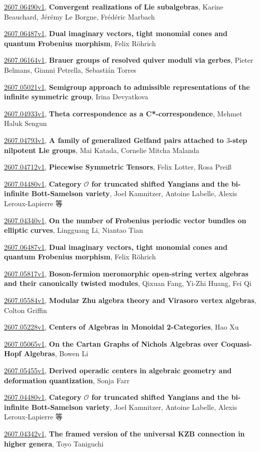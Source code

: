 \documentclass[9pt, a4paper]{article}
\theoremstyle{plain}
\theoremstyle{definition}
\theoremstyle{remark}
\newcommand{\arxiv}[3]{\href{https://arxiv.org/abs/#1}{#1}, \textbf{\textcolor{arxivblue}{#2}}, #3}
\begin{document}
\arxiv{2607.06490v1}{Convergent realizations of Lie subalgebras}{Karine Beauchard, Jérémy Le Borgne, Frédéric Marbach}

\arxiv{2607.06487v1}{Dual imaginary vectors, tight monomial cones and quantum Frobenius morphism}{Felix Röhrich}

\arxiv{2607.06164v1}{Brauer groups of resolved quiver moduli via gerbes}{Pieter Belmans, Gianni Petrella, Sebastián Torres}

\arxiv{2607.05021v1}{Semigroup approach to admissible representations of the infinite symmetric group}{Irina Devyatkova}

\arxiv{2607.04933v1}{Theta correspondence as a C*-correspondence}{Mehmet Haluk Sengun}

\arxiv{2607.04793v1}{A family of generalized Gelfand pairs attached to $3$-step nilpotent Lie groups}{Mai Katada, Cornelie Mitcha Malanda}

\arxiv{2607.04712v1}{Piecewise Symmetric Tensors}{Felix Lotter, Rosa Preiß}

\arxiv{2607.04480v1}{Category $\mathcal{O}$ for truncated shifted Yangians and the bi-infinite Bott-Samelson variety}{Joel Kamnitzer, Antoine Labelle, Alexis Leroux-Lapierre 等}

\arxiv{2607.04340v1}{On the number of Frobenius periodic vector bundles on elliptic curves}{Lingguang Li, Niantao Tian}

\arxiv{2607.06487v1}{Dual imaginary vectors, tight monomial cones and quantum Frobenius morphism}{Felix Röhrich}

\arxiv{2607.05817v1}{Boson-fermion meromorphic open-string vertex algebras and their canonically twisted modules}{Qixuan Fang, Yi-Zhi Huang, Fei Qi}

\arxiv{2607.05584v1}{Modular Zhu algebra theory and Virasoro vertex algebras}{Colton Griffin}

\arxiv{2607.05228v1}{Centers of Algebras in Monoidal 2-Categories}{Hao Xu}

\arxiv{2607.05065v1}{On the Cartan Graphs of Nichols Algebras over Coquasi-Hopf Algebras}{Bowen Li}

\arxiv{2607.05455v1}{Derived operadic centers in algebraic geometry and deformation quantization}{Sonja Farr}

\arxiv{2607.04480v1}{Category $\mathcal{O}$ for truncated shifted Yangians and the bi-infinite Bott-Samelson variety}{Joel Kamnitzer, Antoine Labelle, Alexis Leroux-Lapierre 等}

\arxiv{2607.04342v1}{The framed version of the universal KZB connection in higher genera}{Toyo Taniguchi}

\end{document}
